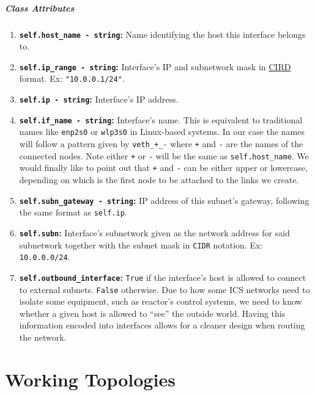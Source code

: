                     \subparagraph{Class Attributes}
                        \begin{enumerate}
                            \item \textbf{\texttt{self.host\_name - string}:} Name identifying the host this interface belongs to.
                            \item \textbf{\texttt{self.ip\_range - string}:} Interface's IP and subnetwork mask in \href{https://en.wikipedia.org/wiki/Classless_Inter-Domain_Routing}{CIRD} format. Ex: \texttt{"10.0.0.1/24"}.
                            \item \textbf{\texttt{self.ip - string}:} Interface's IP address.
                            \item \textbf{\texttt{self.if\_name - string}:} Interface's name. This is equivalent to traditional names like \texttt{enp2s0} or \texttt{wlp3s0} in Linux-based systems. In our case the names will follow a pattern given by \texttt{veth\_+\_-} where \texttt{+} and \texttt{-} are the names of the connected nodes. Note either \texttt{+} or \texttt{-} will be the same as \texttt{self.host\_name}. We would finally like to point out that \texttt{+} and \texttt{-} can be either upper or lowercase, depending on which is the first node to be attached to the links we create.
                            \item \textbf{\texttt{self.subn\_gateway - string}:} IP address of this subnet's gateway, following the same format as \texttt{self.ip}.
                            \item \textbf{\texttt{self.subn}:} Interface's subnetwork given as the network address for said subnetwork together with the subnet mask in \texttt{CIDR} notation. Ex: \texttt{10.0.0.0/24}.
                            \item \textbf{\texttt{self.outbound\_interface}:} \texttt{True} if the interface's host is allowed to connect to external subnets. \texttt{False} otherwise. Due to how some ICS networks need to isolate some equipment, such as reactor's control systems, we need to know whether a given host is allowed to ``see'' the outside world. Having this information encoded into interfaces allows for a cleaner design when routing the network.
                        \end{enumerate}
    \section{Working Topologies}
